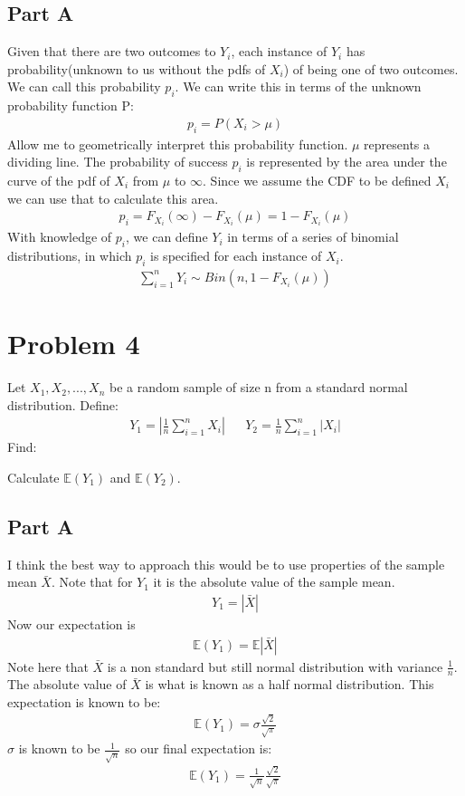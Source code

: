 \documentclass{article}
\begin{document}
\subsection*{Part A}
Given that there are two outcomes to $Y_i$, each instance of $Y_i$ has probability(unknown to us without the pdfs of $X_i$) of being one of two outcomes. We can call this probability $p_i$. We can write this in terms of the unknown probability function P:
\begin{align*}
p_i = P(X_i > \mu)
\end{align*}
Allow me to geometrically interpret this probability function. $\mu$ represents a dividing line. The probability of success $p_i$ is represented by the area under the curve of the pdf of $X_i$ from $\mu$ to $\infty$. Since we assume the CDF to be defined $X_i$ we can use that to calculate this area.
\begin{align*}
p_i = F_{X_i}(\infty) - F_{X_i}(\mu) = 1 - F_{X_i}(\mu)
\end{align*}
With knowledge of $p_i$, we can define $Y_i$ in terms of a series of binomial distributions, in which $p_i$ is specified for each instance of $X_i$.
\begin{align*}
\boxed{ \sum_{i=1}^{n} Y_i \sim Bin(n,1 - F_{X_i}(\mu)) }
\end{align*}

    
\clearpage
\section*{Problem 4}
Let $X_1, X_2,..., X_n$ be a random sample of size n from a standard normal distribution. Define:
\begin{align*}
Y_1 = |\frac{1}{n}\sum_{i=1}^{n}X_i| && Y_2 = \frac{1}{n}\sum_{i=1}^{n}|X_i|
\end{align*}
Find:

Calculate $\mathbb{E}(Y_1)$ and $\mathbb{E}(Y_2)$.
\subsection*{Part A}
I think the best way to approach this would be to use properties of the sample mean $\bar{X}$. Note that for $Y_1$ it is the absolute value of the sample mean.
\begin{align*}
Y_1 = |\bar{X}|
\end{align*}
Now our expectation is
\begin{align*}
\mathbb{E}(Y_1) = \mathbb{E}|\bar{X}|
\end{align*}
Note here that $\bar{X}$ is a non standard but still normal distribution with variance $\frac{1}{n}$. The absolute value of $\bar{X}$ is what is known as a half normal distribution. This expectation is known to be:
\begin{align*}
\mathbb{E}(Y_1) = \sigma \frac{\sqrt{2}}{\sqrt{\pi}}
\end{align*}
$\sigma$ is known to be $\frac{1}{\sqrt{n}}$ so our final expectation is:
\begin{align*}
\boxed{ \mathbb{E}(Y_1) = \frac{1}{\sqrt{n}} \frac{\sqrt{2}}{\sqrt{\pi}} }
\end{align*}
\end{document}
